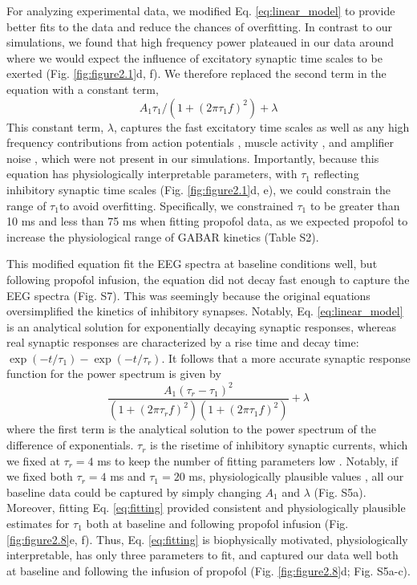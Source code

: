 For analyzing experimental data, we modified Eq. \ref{eq:linear_model} to provide better fits to the data and reduce the chances of overfitting. In contrast to our simulations, we found that high frequency power plateaued in our data around where we would expect the influence of excitatory synaptic time scales to be exerted (Fig. \ref{fig:figure2.1}d, f). We therefore replaced the second term in the equation with a constant term,
\begin{equation}
A_1\tau_1/\left(1+\left(2\pi\tau_1f\right)^2\right)+\lambda    
\end{equation}
This constant term, $\lambda$, captures the fast excitatory time scales as well as any high frequency contributions from action potentials \cite{Buzsaki2012}, muscle activity \cite{Muthukumaraswamy2013}, and amplifier noise \cite{Miller2009}, which were not present in our simulations.  Importantly, because this equation has physiologically interpretable parameters, with $\tau_1$ reflecting inhibitory synaptic time scales (Fig. \ref{fig:figure2.1}d, e), we could constrain the range of $\tau_1 $to avoid overfitting. Specifically, we constrained $\tau_1$ to be greater than 10 ms and less than 75 ms when fitting propofol data, as we expected propofol to increase the physiological range of GABAR kinetics (Table S2). 

This modified equation fit the EEG spectra at baseline conditions well, but following propofol infusion, the equation did not decay fast enough to capture the EEG spectra (Fig. S7). This was seemingly because the original equations oversimplified the kinetics of inhibitory synapses. Notably, Eq. \ref{eq:linear_model} is an analytical solution for exponentially decaying synaptic responses, whereas real synaptic responses are characterized by a rise time and decay time: $\exp{\left(-t/\tau_1\right)}-\exp\left(-t/\tau_r\right)$. It follows that a more accurate synaptic response function for the power spectrum is given by
\begin{equation}\label{eq:fitting}
\frac{A_1\left(\tau_r-\tau_1\right)^2}{\left(1+\left(2\pi\tau_rf\right)^2\right)\left(1+\left(2\pi\tau_1f\right)^2\right)}+\lambda
\end{equation}
where the first term is the analytical solution to the power spectrum of the difference of exponentials. $\tau_r$ is the risetime of inhibitory synaptic currents, which we fixed at $\tau_r=4$ ms to keep the number of fitting parameters low \cite{Sceniak2008}. Notably, if we fixed both $\tau_r=4$ ms and $\tau_1=20$ ms, physiologically plausible values \cite{Sceniak2008}, all our baseline data could be captured by simply changing $A_1$ and $\lambda$ (Fig. S5a). Moreover, fitting Eq. \ref{eq:fitting} provided consistent and physiologically plausible estimates for $\tau_1$ both at baseline and following propofol infusion (Fig. \ref{fig:figure2.8}e, f). Thus, Eq. \ref{eq:fitting} is biophysically motivated, physiologically interpretable, has only three parameters to fit, and captured our data well both at baseline and following the infusion of propofol (Fig. \ref{fig:figure2.8}d; Fig. S5a-c). 

